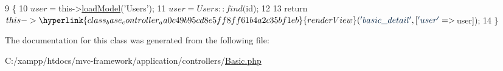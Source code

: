 \begin{DoxyCode}
9                                    \{
10         $user = $this->\hyperlink{class_base_controller_a5fa8890bd3a9d20f5c0cc2377dc49eb1}{loadModel}(\textcolor{stringliteral}{'Users'});
11         $user = Users::find($id);
12 
13         \textcolor{keywordflow}{return} $this->\hyperlink{class_base_controller_aa0c49b95cd8e5ff8ff61b4a2c35bf1eb}{renderView}(\textcolor{stringliteral}{'basic\_detail'}, [\textcolor{stringliteral}{'user'} => $user]);
14     \}
\end{DoxyCode}


The documentation for this class was generated from the following file\+:\begin{DoxyCompactItemize}
\item 
C\+:/xampp/htdocs/mvc-\/framework/application/controllers/\hyperlink{controllers_2_basic_8php}{Basic.\+php}\end{DoxyCompactItemize}
